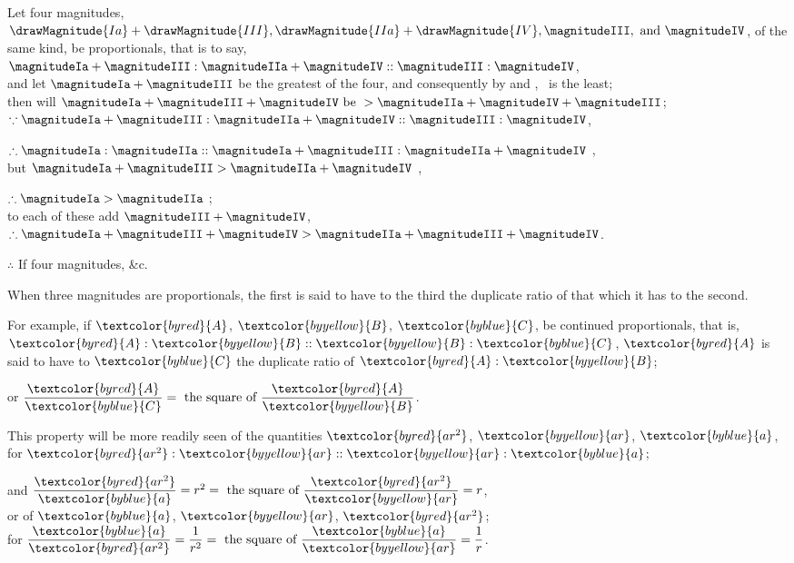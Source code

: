 \documentclass{byrne-book}
\begin{document}
\begin{center}
Let four magnitudes, $\drawMagnitude{Ia} + \drawMagnitude{III}, \drawMagnitude{IIa} + \drawMagnitude{IV}, \magnitudeIII, \mbox{ and } \magnitudeIV$, of the same kind, be proportionals, that is to say,\\
$\magnitudeIa + \magnitudeIII : \magnitudeIIa + \magnitudeIV :: \magnitudeIII : \magnitudeIV$,\\
and let $\magnitudeIa + \magnitudeIII$ be the greatest of the four, and consequently by  and , \magnitudeIV\ is the least;\\
then will $\magnitudeIa + \magnitudeIII + \magnitudeIV \mbox{ be } > \magnitudeIIa + \magnitudeIV + \magnitudeIII$;\\
$\because \magnitudeIa + \magnitudeIII : \magnitudeIIa + \magnitudeIV :: \magnitudeIII : \magnitudeIV$, %

$\therefore \magnitudeIa : \magnitudeIIa :: \magnitudeIa + \magnitudeIII : \magnitudeIIa + \magnitudeIV$ ,\\
but $\magnitudeIa + \magnitudeIII > \magnitudeIIa + \magnitudeIV$ \bycref{\hypref},

$\therefore \magnitudeIa > \magnitudeIIa$ ;\\
to each of these add $\magnitudeIII + \magnitudeIV$,\\
$\therefore \magnitudeIa + \magnitudeIII + \magnitudeIV > \magnitudeIIa + \magnitudeIII + \magnitudeIV$.

$\therefore$ If four magnitudes, \&c.
\end{center}


\vfill\pagebreak

\label{def:V.X} 
\def\varA{\textcolor{byred}{A}}
\def\varB{\textcolor{byyellow}{B}}
\def\varC{\textcolor{byblue}{C}}
\def\vararS{\textcolor{byred}{ar^2}}
\def\varar{\textcolor{byyellow}{ar}}
\def\vara{\textcolor{byblue}{a}}
When three magnitudes are proportionals, the first is said to have to the third the duplicate ratio of that which it has to the second.

For example, if $\varA$, $\varB$, $\varC$, be continued proportionals, that is, $\varA : \varB :: \varB : \varC$, $\varA$ is said to have to $\varC$ the duplicate ratio of $\varA : \varB$;

\begin{center}
or $\dfrac{\varA}{\varC} = \mbox{ the square of } \dfrac{\varA}{\varB}$.

This property will be more readily seen of the quantities $\vararS$, $\varar$, $\vara$, for $\vararS : \varar :: \varar : \vara$;

and $\dfrac{\vararS}{\vara} = r^2 = \mbox{ the square of } \dfrac{\vararS}{\varar} = r$,\\
or of $\vara$, $\varar$, $\vararS$;\\
for $\dfrac{\vara}{\vararS} = \dfrac{1}{r^2} = \mbox{ the square of } \dfrac{\vara}{\varar} = \dfrac{1}{r}$.
\end{center}
\end{document}
